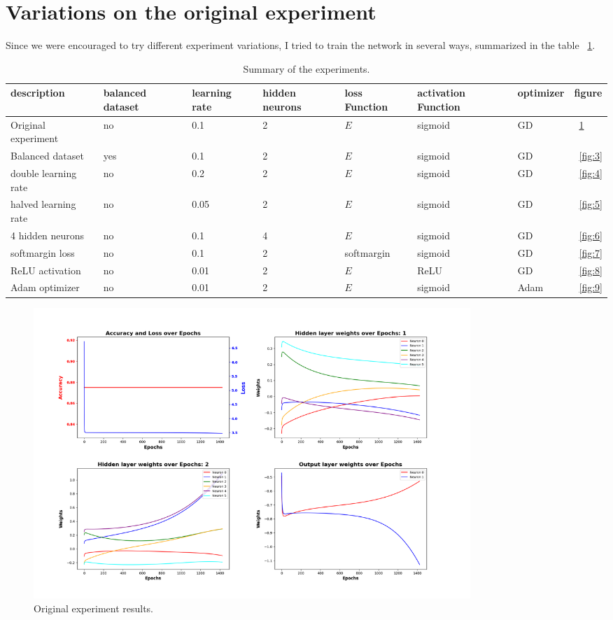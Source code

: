 \documentclass{article}
\begin{document}
    \section{Variations on the original experiment}\label{sec:variations}

    Since we were encouraged to try different experiment variations, I tried to train the network in several ways, summarized in the table ~\ref{tab:1}.

    \newpage %
    \begin{table}
        \footnotesize
        \centering
        \begin{tabular}{ p{2.6cm} p{1.5cm} p{1.5cm} p{1.5cm} p{1.5cm} p{1.5cm} p{1.5cm} p{1.5cm} }
            \hline
            \textbf{description} & \textbf{balanced dataset} & \textbf{learning rate} & \textbf{hidden neurons} & \textbf{loss Function} & \textbf{activation Function} & \textbf{optimizer} & \textbf{figure}\\
            \hline
            Original experiment & no & 0.1 & 2 & $E$ & sigmoid & GD & ~\ref{fig:2}\\
            Balanced dataset & yes & 0.1 & 2 & $E$ & sigmoid & GD & ~\ref{fig:3}\\
            double learning rate & no & 0.2 & 2 & $E$ & sigmoid & GD & ~\ref{fig:4}\\
            halved learning rate & no & 0.05 & 2 & $E$ & sigmoid & GD & ~\ref{fig:5}\\
            4 hidden neurons & no & 0.1 & 4 & $E$ & sigmoid & GD & ~\ref{fig:6}\\
            softmargin loss & no & 0.1 & 2 & softmargin & sigmoid & GD & ~\ref{fig:7}\\
            ReLU activation & no & 0.01 & 2 & $E$ & ReLU & GD & ~\ref{fig:8}\\
            Adam optimizer & no & 0.01 & 2 & $E$ & sigmoid & Adam & ~\ref{fig:9}\\
            \hline
        \end{tabular}
        \caption{Summary of the experiments.}
        \label{tab:1}
    \end{table}

    \begin{figure}
        \centering
        \includegraphics[width=0.8\textwidth]{images/plt-00}
        \caption{Original experiment results.}
        \label{fig:2}
    \end{figure}
\end{document}
